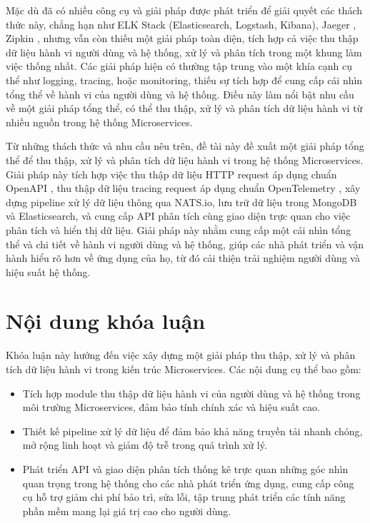 \documentclass{uetgraduation}
\begin{document}
Mặc dù đã có nhiều công cụ và giải pháp được phát triển để giải quyết các thách thức này, chẳng hạn như ELK Stack (Elasticsearch, Logstash, Kibana), Jaeger \cite{jaeger}, Zipkin \cite{zipkin}, nhưng vẫn còn thiếu một giải pháp toàn diện, tích hợp cả việc thu thập dữ liệu hành vi người dùng và hệ thống, xử lý và phân tích trong một khung làm việc thống nhất. Các giải pháp hiện có thường tập trung vào một khía cạnh cụ thể như logging, tracing, hoặc monitoring, thiếu sự tích hợp để cung cấp cái nhìn tổng thể về hành vi của người dùng và hệ thống. Điều này làm nổi bật nhu cầu về một giải pháp tổng thể, có thể thu thập, xử lý và phân tích dữ liệu hành vi từ nhiều nguồn trong hệ thống Microservices.

Từ những thách thức và nhu cầu nêu trên, đề tài này đề xuất một giải pháp tổng thể để thu thập, xử lý và phân tích dữ liệu hành vi trong hệ thống Microservices. Giải pháp này tích hợp việc thu thập dữ liệu HTTP request áp dụng chuẩn OpenAPI \cite{openapi}, thu thập dữ liệu tracing request áp dụng chuẩn OpenTelemetry \cite{otel}, xây dựng pipeline xử lý dữ liệu thông qua NATS.io, lưu trữ dữ liệu trong MongoDB và Elasticsearch, và cung cấp API phân tích cùng giao diện trực quan cho việc phân tích và hiển thị dữ liệu. Giải pháp này nhằm cung cấp một cái nhìn tổng thể và chi tiết về hành vi người dùng và hệ thống, giúp các nhà phát triển và vận hành hiểu rõ hơn về ứng dụng của họ, từ đó cải thiện trải nghiệm người dùng và hiệu suất hệ thống.

\section{Nội dung khóa luận}
Khóa luận này hướng đến việc xây dựng một giải pháp thu thập, xử lý và phân tích dữ liệu hành vi trong kiến trúc Microservices. Các nội dung cụ thể bao gồm:

\begin{itemize}
\item Tích hợp module thu thập dữ liệu hành vi của người dùng và hệ thống trong môi trường Microservices, đảm bảo tính chính xác và hiệu suất cao.
\item Thiết kế pipeline xử lý dữ liệu để đảm bảo khả năng truyền tải nhanh chóng, mở rộng linh hoạt và giảm độ trễ trong quá trình xử lý.
\item Phát triển API và giao diện phân tích thống kê trực quan những góc nhìn quan trọng trong hệ thống cho các nhà phát triển ứng dụng, cung cấp công cụ hỗ trợ giảm chi phí bảo trì, sửa lỗi, tập trung phát triển các tính năng phần mềm mang lại giá trị cao cho người dùng.
\end{itemize}
\end{document}
